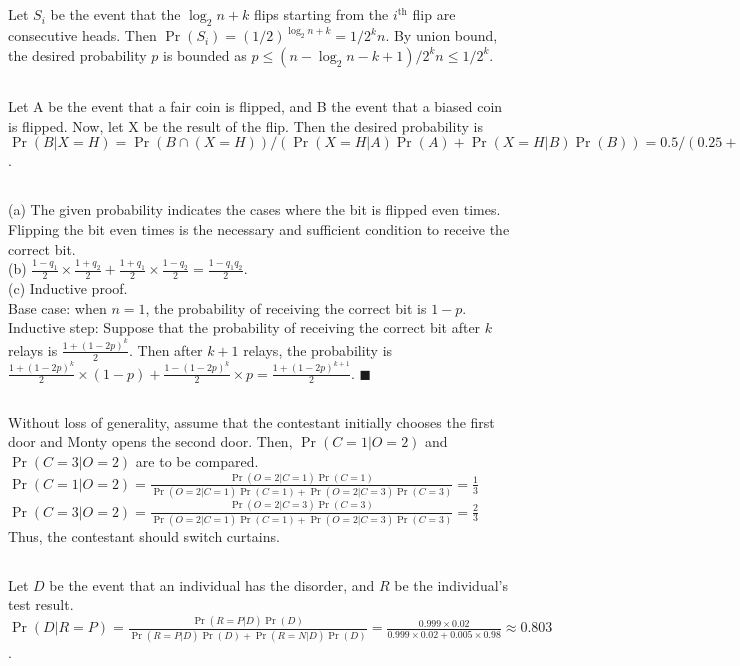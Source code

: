 \documentclass{article}
\begin{document}
\subsection{}
Let $S_i$ be the event that the $\log_2 n + k$ flips starting from the $i^{\text{th}}$ flip are consecutive heads. Then $\Pr(S_i) = (1/2)^{\log_2 n + k} = 1/2^kn$. By union bound, the desired probability $p$ is bounded as $p \leq (n-\log_2 n-k+1)/2^kn \leq 1/2^k$.
\subsection{}
Let A be the event that a fair coin is flipped, and B the event that a biased coin is flipped. Now, let X be the result of the flip. Then the desired probability is $\Pr(B|X=H)=\Pr(B\cap(X=H))/(\Pr(X=H|A)\Pr(A)+\Pr(X=H|B)\Pr(B))=0.5/(0.25+0.5)=2/3$.
\subsection{}
(a) The given probability indicates the cases where the bit is flipped even times. Flipping the bit even times is the necessary and sufficient condition to receive the correct bit.\\
(b) $\frac{1-q_1}{2} \times \frac{1+q_2}{2} + \frac{1+q_1}{2} \times \frac{1-q_2}{2} = \frac{1-q_1q_2}{2}$.\\
(c) Inductive proof.\\
Base case: when $n=1$, the probability of receiving the correct bit is $1-p$.\\
Inductive step: Suppose that the probability of receiving the correct bit after $k$ relays is $\frac{1+(1-2p)^k}{2}$. Then after $k+1$ relays, the probability is $\frac{1+(1-2p)^k}{2} \times (1-p) + \frac{1-(1-2p)^k}{2} \times p = \frac{1+(1-2p)^{k+1}}{2}$. $\blacksquare$
\subsection{}
Without loss of generality, assume that the contestant initially chooses the first door and Monty opens the second door. Then, $\Pr(C=1|O=2)$ and $\Pr(C=3|O=2)$ are to be compared.\\
$\Pr(C=1|O=2)=\frac{\Pr(O=2|C=1)\Pr(C=1)}{\Pr(O=2|C=1)\Pr(C=1)+\Pr(O=2|C=3)\Pr(C=3)}=\frac{1}{3}$\\
$\Pr(C=3|O=2)=\frac{\Pr(O=2|C=3)\Pr(C=3)}{\Pr(O=2|C=1)\Pr(C=1)+\Pr(O=2|C=3)\Pr(C=3)}=\frac{2}{3}$\\
Thus, the contestant should switch curtains.
\subsection{}
Let $D$ be the event that an individual has the disorder, and $R$ be the individual's test result.\\
$\Pr(D|R=P)=\frac{\Pr(R=P|D)\Pr(D)}{\Pr(R=P|D)\Pr(D)+\Pr(R=N|D)\Pr(D)} = \frac{0.999\times0.02}{0.999\times0.02+0.005\times0.98}\approx0.803$.
\end{document}
